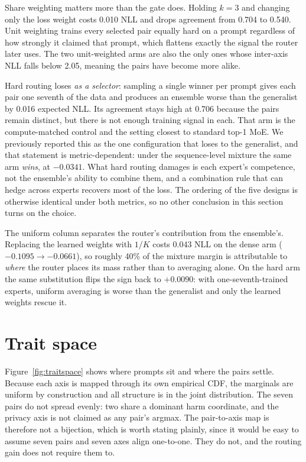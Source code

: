 \documentclass{article}
\begin{document}
Share weighting matters more than the gate does. Holding $k=3$ and changing only the loss weight
costs 0.010 NLL and drops agreement from 0.704 to 0.540. Unit weighting trains every selected pair
equally hard on a prompt regardless of how strongly it claimed that prompt, which flattens exactly
the signal the router later uses. The two unit-weighted arms are also the only ones whose inter-axis
NLL falls below 2.05, meaning the pairs have become more alike.

Hard routing loses \emph{as a selector}: sampling a single winner per prompt gives each pair one
seventh of the data and produces an ensemble worse than the generalist by 0.016 expected NLL. Its
agreement stays high at 0.706 because the pairs remain distinct, but there is not enough training
signal in each. That arm is the compute-matched control and the setting closest to standard top-1
MoE. We previously reported this as the one configuration that loses to the generalist, and that
statement is metric-dependent: under the sequence-level mixture the same arm \emph{wins}, at
$-0.0341$. What hard routing damages is each expert's competence, not the ensemble's ability to
combine them, and a combination rule that can hedge across experts recovers most of the loss. The
ordering of the five designs is otherwise identical under both metrics, so no other conclusion in
this section turns on the choice.

The uniform column separates the router's contribution from the ensemble's. Replacing the learned
weights with $1/K$ costs 0.043 NLL on the dense arm ($-0.1095 \to -0.0661$), so roughly 40\% of the
mixture margin is attributable to \emph{where} the router places its mass rather than to averaging
alone. On the hard arm the same substitution flips the sign back to $+0.0090$: with one-seventh-trained
experts, uniform averaging is worse than the generalist and only the learned weights rescue it.

\section{Trait space}
\label{sec:trait}
Figure~\ref{fig:traitspace} shows where prompts sit and where the pairs settle. Because each axis is
mapped through its own empirical CDF, the marginals are uniform by construction and all structure is
in the joint distribution. The seven pairs do not spread evenly: two share a dominant harm
coordinate, and the privacy axis is not claimed as any pair's argmax. The pair-to-axis map is
therefore not a bijection, which is worth stating plainly, since it would be easy to assume seven
pairs and seven axes align one-to-one. They do not, and the routing gain does not require them to.
\end{document}
